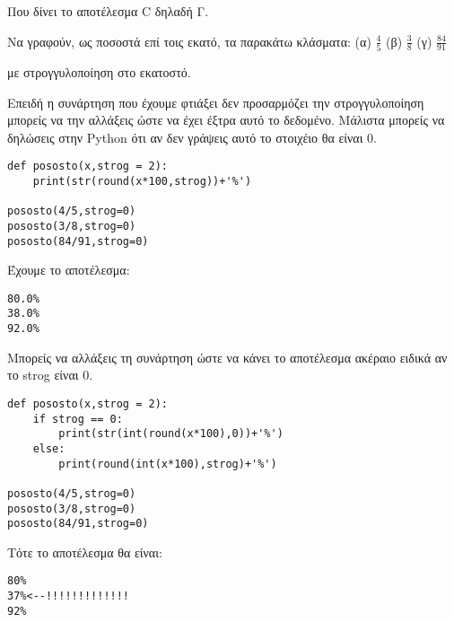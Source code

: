 Που δίνει το αποτέλεσμα C δηλαδή Γ.

\begin{exercise}
Να γραφούν, ως ποσοστά επί τοις εκατό, τα παρακάτω κλάσματα:
(α) $\frac{4}{5}$
(β) $\frac{3}{8}$
(γ) $\frac{84}{91}$

με στρογγυλοποίηση στο εκατοστό.
\end{exercise}

Επειδή η συνάρτηση που έχουμε φτιάξει δεν προσαρμόζει την στρογγυλοποίηση μπορείς να την αλλάξεις ώστε να έχει έξτρα αυτό το δεδομένο. Μάλιστα μπορείς να δηλώσεις στην Python ότι αν δεν γράψεις αυτό το στοιχέιο θα είναι 0.
\begin{lstlisting}
def pososto(x,strog = 2):
    print(str(round(x*100,strog))+'%')

pososto(4/5,strog=0)
pososto(3/8,strog=0)
pososto(84/91,strog=0)
\end{lstlisting}

Έχουμε το αποτέλεσμα:
\begin{lstlisting}
80.0%
38.0%
92.0%
\end{lstlisting}
Μπορείς να αλλάξεις τη συνάρτηση ώστε να κάνει το αποτέλεσμα ακέραιο ειδικά αν το strog είναι 0.
\begin{lstlisting}
def pososto(x,strog = 2):
    if strog == 0:
        print(str(int(round(x*100),0))+'%')
    else:
        print(round(int(x*100),strog)+'%')

pososto(4/5,strog=0)
pososto(3/8,strog=0)
pososto(84/91,strog=0)
\end{lstlisting}

Τότε το αποτέλεσμα θα είναι:
\begin{lstlisting}
80%
37%<--!!!!!!!!!!!!!
92%
\end{lstlisting}
